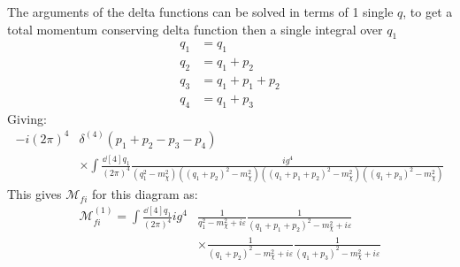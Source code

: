 \documentclass[12pt]{article}
\newcommand{\veps}{\varepsilon}
\newcommand{\circled}[1]{\tikz[baseline=(char.base)]{
    \node[shape=circle,draw,inner sep=2pt](char){#1};}}
\begin{document}
The arguments of the delta functions can be solved in terms of 1 single $q$, to get a total momentum conserving delta function then a single integral over $q_1$
\begin{align*}
  q_1&=q_1\\
  q_2&=q_1+p_2\\
  q_3&=q_1+p_1+p_2\\
  q_4&=q_1+p_3
\end{align*}
Giving:
\begin{align*}
  -i(2\pi)^4&\delta^{(4)}(p_1+p_2-p_3-p_4)\\
  &\times\int\frac{\dd[4]{q_1}}{(2\pi)^4}
  \frac{ig^4}{(q_1^2-m_\chi^2)((q_1+p_2)^2-m_\chi^2)
    ((q_1+p_1+p_2)^2-m_\chi^2)((q_1+p_3)^2-m_\chi^2)}
\end{align*}
This gives $\mathcal{M}_{fi}$ for this diagram as:
\begin{align*}
  \mathcal{M}_{fi}^{(1)}=
  \int\frac{\dd[4]{q_1}}{(2\pi)^4}ig^4&
  \frac1{q_1^2-m_\chi^2+i\veps}\frac1{(q_1+p_1+p_2)^2-m_\chi^2+i\veps}\\
  &\times\frac1{(q_1+p_2)^2-m_\chi^2+i\veps}\frac1{(q_1+p_3)^2-m_\chi^2+i\veps}
\end{align*}
\end{document}

